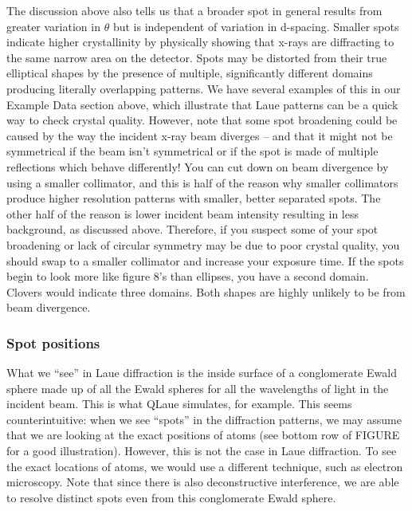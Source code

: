 The discussion above also tells us that a broader spot in general results from greater variation in $\theta$ but is independent of variation in d-spacing. Smaller spots indicate higher crystallinity by physically showing that x-rays are diffracting to the same narrow area on the detector. Spots may be distorted from their true elliptical shapes by the presence of multiple, significantly different domains producing literally overlapping patterns. We have several examples of this in our Example Data section above, which illustrate that Laue patterns can be a quick way to check crystal quality. However, note that some spot broadening could be caused by the way the incident x-ray beam diverges – and that it might not be symmetrical if the beam isn’t symmetrical or if the spot is made of multiple reflections which behave differently!
You can cut down on beam divergence by using a smaller collimator, and this is half of the reason why smaller collimators produce higher resolution patterns with smaller, better separated spots. The other half of the reason is lower incident beam intensity resulting in less background, as discussed above.
Therefore, if you suspect some of your spot broadening or lack of circular symmetry may be due to poor crystal quality, you should swap to a smaller collimator and increase your exposure time. If the spots begin to look more like figure 8’s than ellipses, you have a second domain. Clovers would indicate three domains. Both shapes are highly unlikely to be from beam divergence. 
\subsubsection{Spot positions}
What we “see” in Laue diffraction is the inside surface of a conglomerate Ewald sphere made up of all the Ewald spheres for all the wavelengths of light in the incident beam. This is what QLaue simulates, for example.
This seems counterintuitive: when we see “spots” in the diffraction patterns, we may assume that we are looking at the exact positions of atoms (see bottom row of FIGURE for a good illustration). However, this is not the case in Laue diffraction. To see the exact locations of atoms, we would use a different technique, such as electron microscopy.
Note that since there is also deconstructive interference, we are able to resolve distinct spots even from this conglomerate Ewald sphere. 
